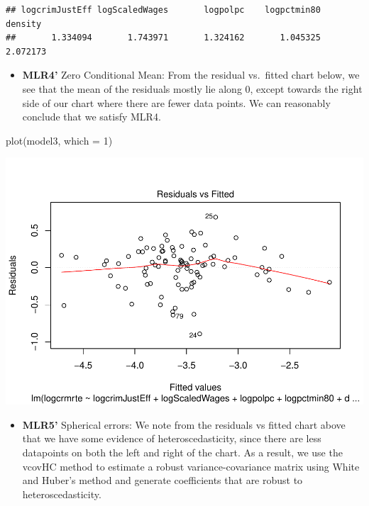 \documentclass[]{article}
\newenvironment{Shaded}{}{}
\newcommand{\DataTypeTok}[1]{#1}
\newcommand{\DecValTok}[1]{#1}
\newcommand{\KeywordTok}[1]{\textcolor[rgb]{0.00,0.00,1.00}{#1}}
\newcommand{\NormalTok}[1]{#1}
\providecommand{\tightlist}{%
  \setlength{\itemsep}{0pt}\setlength{\parskip}{0pt}}
\begin{document}
\begin{verbatim}
## logcrimJustEff logScaledWages       logpolpc    logpctmin80        density 
##       1.334094       1.743971       1.324162       1.045325       2.072173
\end{verbatim}

\begin{itemize}
\tightlist
\item
  \textbf{MLR4'} Zero Conditional Mean: From the residual vs.~fitted
  chart below, we see that the mean of the residuals mostly lie along 0,
  except towards the right side of our chart where there are fewer data
  points. We can reasonably conclude that we satisfy MLR4.
\end{itemize}

\begin{Shaded}
\begin{Highlighting}[]
\KeywordTok{plot}\NormalTok{(model3, }\DataTypeTok{which =} \DecValTok{1}\NormalTok{)}
\end{Highlighting}
\end{Shaded}

\includegraphics{Bagnard_Gaustad_Hartman_Leung_Lab_3_files/figure-latex/unnamed-chunk-85-1.pdf}

\begin{itemize}
\tightlist
\item
  \textbf{MLR5'} Spherical errors: We note from the residuals vs fitted
  chart above that we have some evidence of heteroscedasticity, since
  there are less datapoints on both the left and right of the chart. As
  a result, we use the vcovHC method to estimate a robust
  variance-covariance matrix using White and Huber's method and generate
  coefficients that are robust to heteroscedasticity.
\end{itemize}
\end{document}
